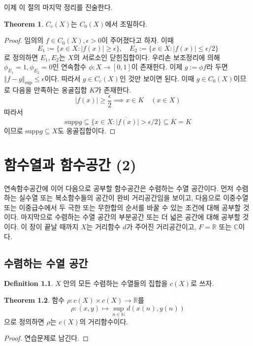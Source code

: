 \documentclass[11pt]{book}
\numberwithin{equation}{chapter}
\def\NN{\mathbb{N}}
\def\RR{\mathbb{R}}
\def\CC{\mathbb{C}}
\def\eps{\epsilon}
\newcommand{\abs}[1]{\left\vert#1\right\vert}
\newcommand{\norm}[1]{\left\Vert#1\right\Vert}
\theoremstyle{definition}
\newtheorem{thm}{Theorem}[section]
\newtheorem{defn}[thm]{Definition}
\begin{document}
이제 이 절의 마지막 정리를 진술한다.

\begin{thm} \label{10.4.11}
    \(C_c(X)\)는 \(C_0(X)\)에서 조밀하다.
\end{thm}
\begin{proof}
    임의의 \(f \in C_0(X), \eps > 0\)이 주어졌다고 하자. 이때
    \[
    E_1 := \{x \in X : \abs{f(x)} \ge \eps\}, \quad E_2 := \{x \in X : \abs{f(x)} \le \eps/2\}    
    \]
    로 정의하면 \(E_1, E_2\)는 \(X\)의 서로소인 닫힌집합이다. 우리손 보조정리에 의해 \(\phi_{E_1} = 1, \phi_{E_2} = 0\)인 연속함수 \(\phi : X \to [0, 1]\)이 존재한다. 이제 \(g := \phi f\)라 두면 \(\norm{f - g}_{\sup} \le \eps\)이다. 따라서 \(g \in C_c(X)\)인 것만 보이면 된다. 이때 \(g \in C_0(X)\)이므로 다음을 만족하는 옹골집합 \(K\)가 존재한다.
    \[
    \abs{f(x)} \ge \frac{\eps}{2} \implies x \in K \quad (x \in X)    
    \]
    따라서
    \[
    \text{supp} g \subseteq \overline{\{x \in X : \abs{f(x)} > \eps / 2\}} \subseteq \overline{K} = K
    \]
    이므로 \(\text{supp} g \subseteq X\)도 옹골집합이다.
\end{proof}



\chapter{함수열과 함수공간 (2)}

연속함수공간에 이어 다음으로 공부할 함수공간은 수렴하는 수열 공간이다. 먼저 수렴하는 실수열 또는 복소함수들의 공간이 완비 거리공간임을 보이고, 다음으로 이중수열 또는 이중급수에서 두 극한 또는 무한합의 순서를 바꿀 수 있는 조건에 대해 공부할 것이다. 마지막으로 수렴하는 수열 공간의 부분공간 또는 더 넓은 공간에 대해 공부할 것이다. 이 장이 끝날 때까지 \(X\)는 거리함수 \(d\)가 주어진 거리공간이고, \(F = \RR\) 또는 \(\CC\)이다.

\section{수렴하는 수열 공간}

\begin{defn}
    \(X\) 안의 모든 수렴하는 수열들의 집합을 \(c(X)\)로 쓰자.
\end{defn}

\begin{thm}
    함수 \(\rho : c(X) \times c(X) \to \RR\)를
    \[
    \rho : (x, y) \mapsto \sup_{n \in \NN} d(x(n), y(n))
    \]
    으로 정의하면 \(\rho\)는 \(c(X)\)의 거리함수이다.
\end{thm}
\begin{proof}
    연습문제로 남긴다.
\end{proof}
\end{document}
